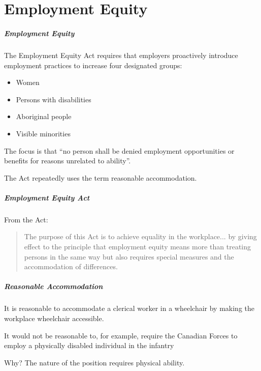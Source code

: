 \part{Employment Equity}

\begin{frame}
\partpage
\end{frame}



\begin{frame}
\frametitle{Employment Equity}

The Employment Equity Act requires that employers proactively introduce employment practices to increase four designated groups:

\begin{itemize}
	\item Women
	\item Persons with disabilities
	\item Aboriginal people
	\item Visible minorities
\end{itemize}

The focus is that ``no person shall be denied employment opportunities or benefits for reasons unrelated to ability''.

The Act repeatedly uses the term \alert{reasonable accommodation}.
\end{frame}



\begin{frame}
\frametitle{Employment Equity Act}

From the Act:

\begin{quote}
	The purpose of this Act is to achieve equality in the workplace... by giving effect to the principle that employment equity means more than treating persons in the same way but also requires special measures and the accommodation of differences.
\end{quote}

\end{frame}



\begin{frame}
\frametitle{Reasonable Accommodation}


It is reasonable to accommodate a clerical worker in a wheelchair by making the workplace wheelchair accessible.

It would not be reasonable to, for example, require the Canadian Forces to employ a physically disabled individual in the infantry 

Why? The nature of the position requires physical ability.

\end{frame}



